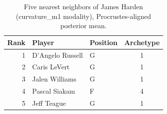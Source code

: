 \begin{table}[htbp]
  \centering\small
  \begin{tabular}{rllc}
    \toprule
    Rank & Player & Position & Archetype \\
    \midrule
    1 & D'Angelo Russell & G & 1 \\
    2 & Caris LeVert & G & 1 \\
    3 & Jalen Williams & G & 1 \\
    4 & Pascal Siakam & F & 4 \\
    5 & Jeff Teague & G & 1 \\
    \bottomrule
  \end{tabular}
  \caption{Five nearest neighbors of James Harden (curvature_m1 modality), Procrustes-aligned posterior mean.}
  \label{tab:James_Harden_neighbors_curvature_m1}
\end{table}

